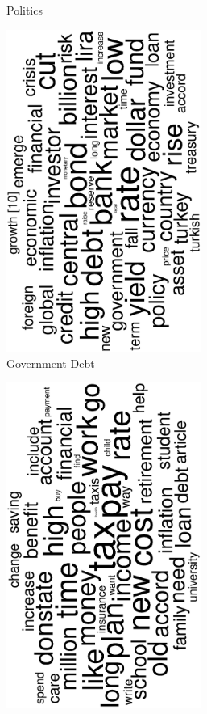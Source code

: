 \begin{figure}
\begin{subfigure}{0.32\textwidth}
		\caption{Politics}
	\end{subfigure}
	\begin{subfigure}{0.32\textwidth}
		\includegraphics[width=0.7\textwidth,angle=270]{figures/wordcloud12.eps}
		\caption{Government Debt}
	\end{subfigure}
	\begin{subfigure}{0.32\textwidth}
		\includegraphics[width=0.7\textwidth,angle=270]{figures/wordcloud13.eps}

\end{subfigure}
\end{figure}
